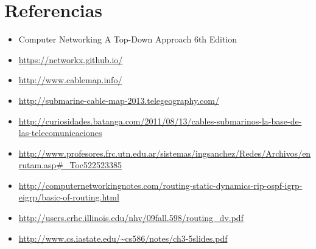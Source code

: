 \documentclass[11pt]{article}
\begin{document}
\section{Referencias}
\begin{itemize}
\item Computer Networking A Top-Down Approach 6th Edition
\item \url{https://networkx.github.io/}
\item \url{http://www.cablemap.info/}
\item \url{http://submarine-cable-map-2013.telegeography.com/}
\item \scriptsize \url{http://curiosidades.batanga.com/2011/08/13/cables-submarinos-la-base-de-las-telecomunicaciones}
\item \url{http://www.profesores.frc.utn.edu.ar/sistemas/ingsanchez/Redes/Archivos/enrutam.asp#_Toc522523385}
\item \small \url{http://computernetworkingnotes.com/routing-static-dynamics-rip-ospf-igrp-eigrp/basic-of-routing.html}
\item \url{http://users.crhc.illinois.edu/nhv/09fall.598/routing_dv.pdf}
\item \url{http://www.cs.iastate.edu/~cs586/notes/ch3-5slides.pdf}
\end{itemize}
\end{document}
